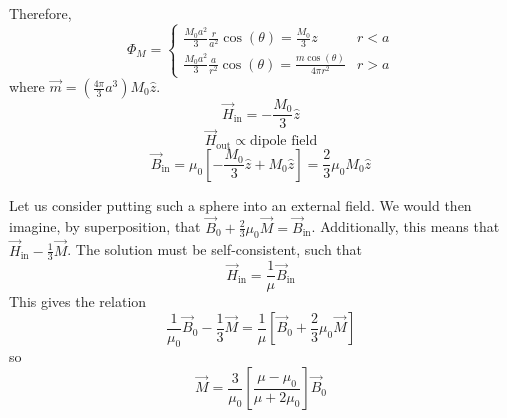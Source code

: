 \documentclass[a4paper,twoside,master.tex]{subfiles}
\begin{document}
\begin{ex}
\begin{equation}
    \end{equation}
    Therefore,
    \begin{equation}
        \Phi_M =
        \begin{cases}
            \frac{M_0 a^2}{3} \frac{r}{a^2} \cos(\theta) = \frac{M_0}{3} z & r<a\\
            \frac{M_0 a^2}{3} \frac{a}{r^2} \cos(\theta) = \frac{m \cos(\theta)}{4 \pi r^2} & r>a
        \end{cases}
    \end{equation}
    where $ \vec{m} = \left( \frac{4 \pi}{3} a^3 \right)M_0 \hat{z} $.
    \begin{equation}
        \vec{H}_{\text{in}} = - \frac{M_0}{3} \hat{z}
    \end{equation}
    \begin{equation}
        \vec{H}_{\text{out}} \propto \text{dipole field}
    \end{equation}
    \begin{equation}
        \vec{B}_{\text{in}} = \mu_0 \left[ - \frac{M_0}{3} \hat{z} + M_0 \hat{z} \right]= \frac{2}{3} \mu_0 M_0 \hat{z}
    \end{equation}
\end{ex}
\begin{ex}
    Let us consider putting such a sphere into an external field. We would then imagine, by superposition, that $ \vec{B}_0 + \frac{2}{3} \mu_0 \vec{M} = \vec{B}_{\text{in}} $. Additionally, this means that $ \vec{H}_{\text{in}} - \frac{1}{3} \vec{M} $. The solution must be self-consistent, such that
    \begin{equation}
        \vec{H}_{\text{in}} = \frac{1}{\mu} \vec{B}_{\text{in}}
    \end{equation}
    This gives the relation
    \begin{equation}
        \frac{1}{\mu_0} \vec{B}_0 - \frac{1}{3} \vec{M} = \frac{1}{\mu} \left[ \vec{B}_0 + \frac{2}{3} \mu_0 \vec{M}\right]
    \end{equation}
    so
    \begin{equation}
        \vec{M} = \frac{3}{\mu_0} \left[ \frac{\mu - \mu_0}{\mu + 2 \mu_0} \right] \vec{B}_0
    \end{equation}
\end{ex}
\end{document}
